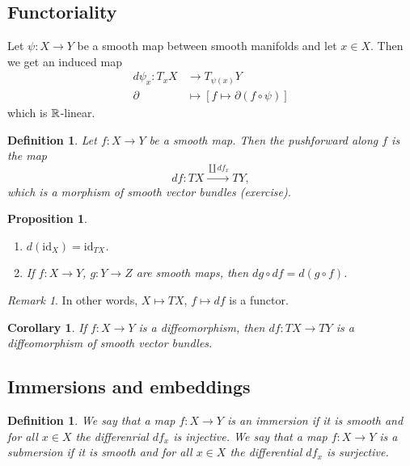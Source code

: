 \documentclass[A4paper, british, reqno]{amsart}
\theoremstyle{darkgreentheorem}
\newtheorem{prop}[thm]{Proposition}
\newtheorem{cor}[thm]{Corollary}
\theoremstyle{darkbluedefinition}
\newtheorem{defn}[thm]{Definition}
\theoremstyle{darkredexample}
\theoremstyle{remark}
\newtheorem{rem}[thm]{Remark}
\newcommand{\1}{\mathbbm{1}}
\newcommand{\id}{\mathrm{id}}
\begin{document}
\subsection{Functoriality}

Let $\psi\colon X\to Y$ be a smooth map between smooth manifolds and let $x\in X$.
Then we get an induced map
\begin{align*}
    d\psi_{x}\colon T_{x}X&\longrightarrow T_{\psi(x)}Y \\
    \partial &\longmapsto [f\mapsto \partial(f\circ \psi)]
\end{align*}
which is $\mathbb{R}$-linear.

\begin{defn}
    Let $f\colon X\to Y$ be a smooth map.
    Then the \textit{pushforward along $f$} is the map
    \[df\colon TX\xrightarrow{\coprod df_{x}} TY, \]
    which is a morphism of smooth vector bundles (exercise).
\end{defn}

\begin{prop}
    \begin{enumerate}
	\item $d(\id_{X})=\id_{TX}$.
	\item If $f\colon X\to Y$, $g\colon Y\to Z$ are smooth maps, then $dg\circ df=d(g\circ f)$.
    \end{enumerate}
\end{prop}

\begin{rem}
    In other words, $X\mapsto TX$, $f\mapsto df$ is a functor.
\end{rem}

\begin{cor}
    If $f\colon X\to Y$ is a diffeomorphism, then $df\colon TX\to TY$ is a diffeomorphism of smooth vector bundles.
\end{cor}

\subsection{Immersions and embeddings}

\begin{defn}
    We say that a map $f\colon X\to Y$ is an \textit{immersion} if it is smooth and for all $x\in X$ the differenrial $df_{x}$ is injective.
    We say that a map $f\colon X\to Y$ is a \textit{submersion} if it is smooth and for all $x\in X$ the differential $df_{x}$ is surjective.
\end{defn}
\end{document}
